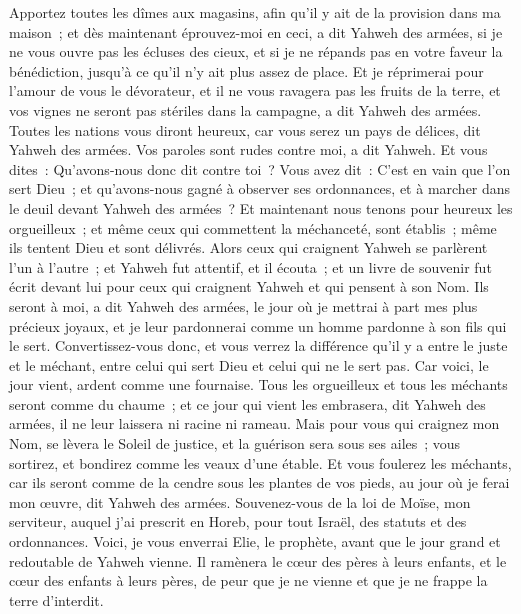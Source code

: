 \begin{multicols}{2}
Apportez toutes les dîmes aux magasins, afin qu'il y ait de la provision dans ma maison~; et dès maintenant éprouvez-moi en ceci, a dit Yahweh des armées, si je ne vous ouvre pas les écluses des cieux, et si je ne répands pas en votre faveur la bénédiction, jusqu'à ce qu'il n'y ait plus assez de place.
Et je réprimerai pour l'amour de vous le dévorateur, et il ne vous ravagera pas les fruits de la terre, et vos vignes ne seront pas stériles dans la campagne, a dit Yahweh des armées.
Toutes les nations vous diront heureux, car vous serez un pays de délices, dit Yahweh des armées.
Vos paroles sont rudes contre moi, a dit Yahweh. Et vous dites~: Qu'avons-nous donc dit contre toi~?
Vous avez dit~: C'est en vain que l'on sert Dieu~; et qu'avons-nous gagné à observer ses ordonnances, et à marcher dans le deuil devant Yahweh des armées~?
Et maintenant nous tenons pour heureux les orgueilleux~; et même ceux qui commettent la méchanceté, sont établis~; même ils tentent Dieu et sont délivrés.
Alors ceux qui craignent Yahweh se parlèrent l'un à l'autre~; et Yahweh fut attentif, et il écouta~; et un livre de souvenir fut écrit devant lui pour ceux qui craignent Yahweh et qui pensent à son Nom.
Ils seront à moi, a dit Yahweh des armées, le jour où je mettrai à part mes plus précieux joyaux, et je leur pardonnerai comme un homme pardonne à son fils qui le sert.
Convertissez-vous donc, et vous verrez la différence qu'il y a entre le juste et le méchant, entre celui qui sert Dieu et celui qui ne le sert pas.
\VerseOne{}Car voici, le jour vient, ardent comme une fournaise. Tous les orgueilleux et tous les méchants seront comme du chaume~; et ce jour qui vient les embrasera, dit Yahweh des armées, il ne leur laissera ni racine ni rameau.
Mais pour vous qui craignez mon Nom, se lèvera le Soleil de justice, et la guérison sera sous ses ailes~; vous sortirez, et bondirez comme les veaux d'une étable.
Et vous foulerez les méchants, car ils seront comme de la cendre sous les plantes de vos pieds, au jour où je ferai mon œuvre, dit Yahweh des armées.
Souvenez-vous de la loi de Moïse, mon serviteur, auquel j'ai prescrit en Horeb, pour tout Israël, des statuts et des ordonnances.
Voici, je vous enverrai Elie, le prophète, avant que le jour grand et redoutable de Yahweh vienne.
Il ramènera le cœur des pères à leurs enfants, et le cœur des enfants à leurs pères, de peur que je ne vienne et que je ne frappe la terre d'interdit.
\PPE{}
\end{multicols}
